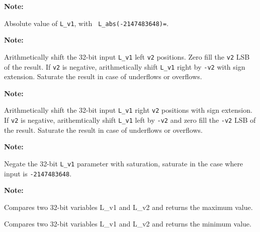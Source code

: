 \textbf{Note:} \hfill {}


Absolute value of {\tt L\_v1}, with {\tt
L\_abs(-2147483648)=}.

\textbf{Note:} \hfill {}


Arithmetically shift the 32-bit input {\tt L\_v1} left {\tt v2}
positions. Zero fill the {\tt v2} LSB of the result. If {\tt v2}
is negative, arithmetically shift {\tt L\_v1} right by {\tt -v2}
with sign extension. Saturate the result in case of underflows or
overflows.

\textbf{Note:} \hfill {}


Arithmetically shift the 32-bit input {\tt L\_v1} right {\tt v2}
positions with sign extension. If {\tt v2} is negative,
arithemtically shift {\tt L\_v1} left by {\tt -v2} and zero fill
the {\tt -v2} LSB of the result. Saturate the result in case of
underflows or overflows.

\textbf{Note:} \hfill {}


Negate the 32-bit {\tt L\_v1} parameter with saturation, saturate in the
case where input is {\tt -2147483648}.

\textbf{Note:} \hfill {}

 

Compares two 32-bit variables L\_v1 and L\_v2 and returns the
maximum value. 

 

Compares two 32-bit variables L\_v1 and L\_v2 and returns the
minimum value.


